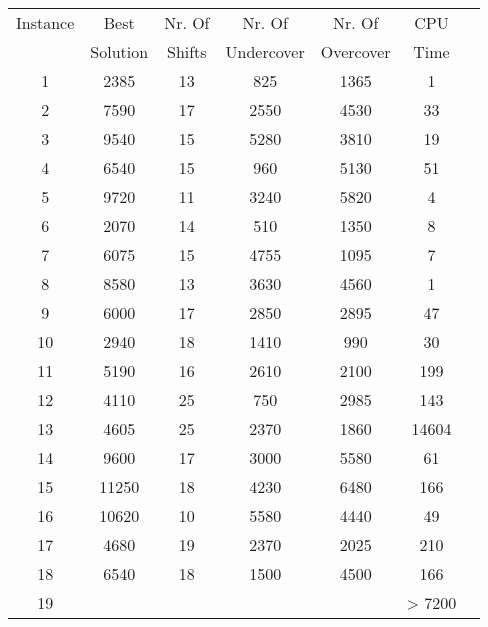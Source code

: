 \begin{table} \small
\centering
\begin{tabular}{ccccccc}
\hline
 Instance & Best & Nr. Of & Nr. Of  & Nr. Of   & CPU   \\
 & Solution & Shifts & Undercover & Overcover & Time  \\
\hline
1 &  2385	& 13 & 825 & 1365 & 1   \\

2 &  7590	& 17 & 2550 & 4530 & 33  \\

3 &  9540 	& 15 & 5280 & 3810 & 19    \\

4 &  6540	& 15 & 960 & 5130 & 51 \\

5 &  9720	& 11 & 3240 & 5820 & 4     \\

6 &  2070	& 14 & 510 & 1350 & 8  \\

7 &  6075	& 15 & 4755 & 1095 & 7    \\

8 &   8580	& 13 & 3630 & 4560 & 1  \\

9 &  6000	& 17 & 2850 & 2895 & 47  \\

10 &  2940	& 18 & 1410 & 990 & 30   \\

11 &  5190	& 16 & 2610 &2100 & 199   \\

12 &  4110	& 25 & 750 & 2985 & 143  \\

13 &  4605 	& 25 & 2370 & 1860 & 14604   \\

14 &  9600	& 17 & 3000 & 5580 & 61  \\

15 &  11250	& 18 & 4230 & 6480 & 166     \\

16 &  10620	& 10 & 5580 &  4440 & 49  \\

17 &  4680	& 19 & 2370 & 2025 & 210   \\

18 &   6540	& 18 & 1500 & 4500 & 166  \\

19 &  	&  &  & & > 7200   \\


\end{tabular}
\end{table}
